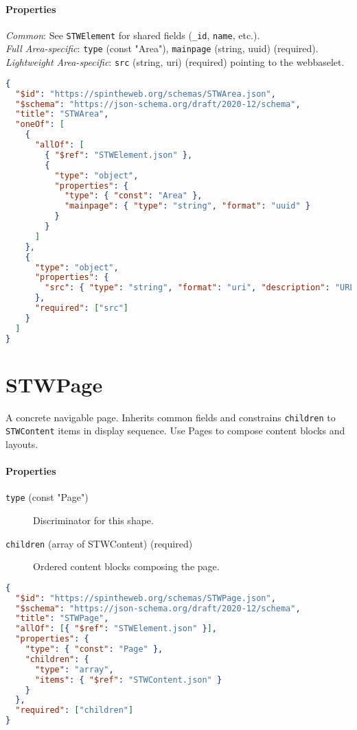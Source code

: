 \paragraph{Properties}
  \textit{Common}: See \texttt{STWElement} for shared fields (\texttt{\_id}, \texttt{name}, etc.).\\
  \textit{Full Area-specific}: \texttt{type} (const "Area"), \texttt{mainpage} (string, uuid) (required).\\
  \textit{Lightweight Area-specific}: \texttt{src} (string, uri) (required) pointing to the webbaselet.
\begin{lstlisting}[language=JSON,caption={STWArea Schema Definition (two shapes via oneOf)}]
{
  "$id": "https://spintheweb.org/schemas/STWArea.json",
  "$schema": "https://json-schema.org/draft/2020-12/schema",
  "title": "STWArea",
  "oneOf": [
    {
      "allOf": [
        { "$ref": "STWElement.json" },
        {
          "type": "object",
          "properties": {
            "type": { "const": "Area" },
            "mainpage": { "type": "string", "format": "uuid" }
          }
        }
      ]
    },
    {
      "type": "object",
      "properties": {
        "src": { "type": "string", "format": "uri", "description": "URL of a webbaselet" }
      },
      "required": ["src"]
    }
  ]
}
\end{lstlisting}

\section{STWPage}
A concrete navigable page. Inherits common fields and constrains \texttt{children} to \texttt{STWContent} items in display sequence. Use Pages to compose content blocks and layouts.
\paragraph{Properties}
\begin{description}
  \item[\texttt{type} (const "Page")] Discriminator for this shape.
  \item[\texttt{children} (array of STWContent) (required)] Ordered content blocks composing the page.
\end{description}
\begin{lstlisting}[language=JSON,caption={STWPage Schema Definition}]
{
  "$id": "https://spintheweb.org/schemas/STWPage.json",
  "$schema": "https://json-schema.org/draft/2020-12/schema",
  "title": "STWPage",
  "allOf": [{ "$ref": "STWElement.json" }],
  "properties": {
    "type": { "const": "Page" },
    "children": {
      "type": "array",
      "items": { "$ref": "STWContent.json" }
    }
  },
  "required": ["children"]
}
\end{lstlisting}

